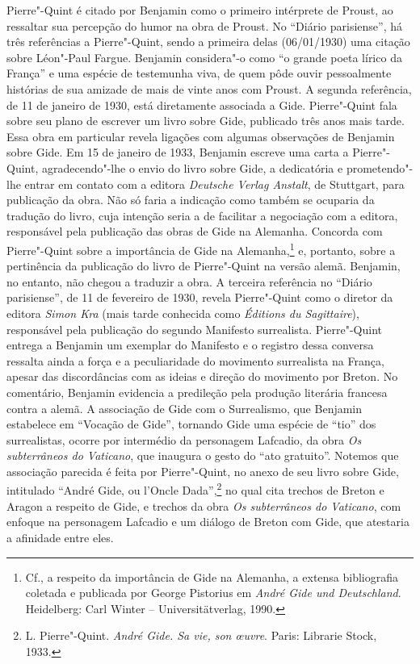 Pierre"-Quint é citado por Benjamin como o primeiro intérprete de Proust,
ao ressaltar sua percepção do humor na obra de Proust. No ``Diário
parisiense'', há três referências a Pierre"-Quint, sendo a primeira delas
(06/01/1930) uma citação sobre Léon"-Paul Fargue. Benjamin considera"-o como
``o grande poeta lírico da França'' e uma espécie de testemunha viva, de
quem pôde ouvir pessoalmente histórias de sua amizade de mais de vinte
anos com Proust. A segunda referência, de 11 de janeiro de 1930, está
diretamente associada a Gide. Pierre"-Quint fala sobre seu plano de
escrever um livro sobre Gide, publicado três anos mais tarde. Essa obra
em particular revela ligações com algumas observações de Benjamin sobre
Gide. Em 15 de janeiro de 1933, Benjamin escreve uma carta a Pierre"-Quint,
agradecendo"-lhe o envio do livro sobre Gide, a dedicatória e
prometendo"-lhe entrar em contato com a editora \emph{Deutsche Verlag
Anstalt}, de Stuttgart, para publicação da obra. Não só faria a
indicação como também se ocuparia da tradução do livro, cuja intenção
seria a de facilitar a negociação com a editora, responsável pela
publicação das obras de Gide na Alemanha. Concorda com Pierre"-Quint
sobre a importância de Gide na Alemanha,\footnote{Cf., a respeito da
  importância de Gide na Alemanha, a extensa bibliografia coletada e
  publicada por George Pistorius em \emph{André Gide und Deutschland}.
  Heidelberg: Carl Winter -- Universitätverlag, 1990.} e, portanto, sobre
a pertinência da publicação do livro de Pierre"-Quint na versão alemã.
Benjamin, no entanto, não chegou a traduzir a obra. A terceira
referência no ``Diário parisiense'', de 11 de fevereiro de 1930, revela Pierre"-Quint
como o diretor da editora \emph{Simon Kra} (mais tarde conhecida como
\emph{Éditions du Sagittaire}), responsável pela publicação do segundo
Manifesto surrealista. Pierre"-Quint entrega a Benjamin um exemplar do
Manifesto e o registro dessa conversa ressalta ainda a força e a
peculiaridade do movimento surrealista na França, apesar das
discordâncias com as ideias e direção do movimento por Breton. No
comentário, Benjamin evidencia a predileção pela produção literária
francesa contra a alemã. A associação de Gide com o Surrealismo, que
Benjamin estabelece em ``Vocação de Gide'', tornando Gide uma espécie de
``tio'' dos surrealistas, ocorre por intermédio da personagem
Lafcadio, da obra \emph{Os subterrâneos do Vaticano}, que
inaugura o gesto do ``ato gratuito''. Notemos que associação parecida é
feita por Pierre"-Quint, no anexo de seu livro sobre Gide, intitulado
``André Gide, ou l'Oncle Dada'',\footnote{L. Pierre"-Quint. \emph{André
  Gide. Sa vie, son \oe uvre}. Paris: Librarie Stock, 1933.} no qual
cita trechos de Breton e Aragon a respeito de Gide, e trechos da obra
\emph{Os subterrâneos do Vaticano}, com enfoque na personagem
Lafcadio e um diálogo de Breton com Gide, que atestaria a afinidade
entre eles.

